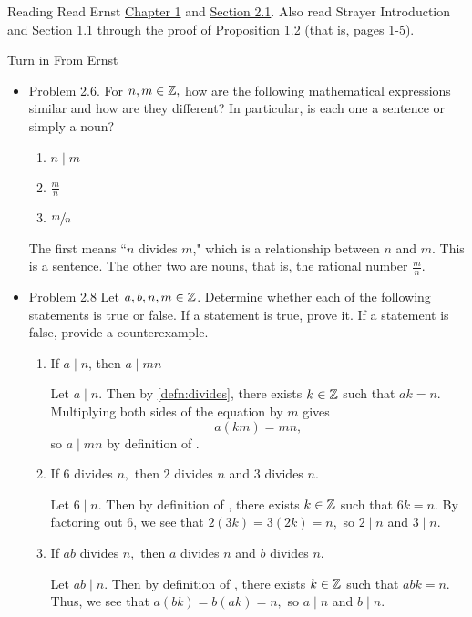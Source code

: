 \documentclass{ximera}
\begin{document}
  
\begin{pre}
\item[Reading]  Read Ernst  \href{https://danaernst.com/IBL-IntroToProof/pretext/chap_intro.html}{Chapter 1} and \href{https://danaernst.com/IBL-IntroToProof/pretext/sec_baby_number_theory.html}{Section 2.1}. Also read Strayer Introduction and Section 1.1 through the proof of Proposition 1.2 (that is, pages 1-5).

\item[Turn in] From Ernst
\begin{itemize}
 \item Problem 2.6. For $n,m\in\mathbb Z,$ how are the following mathematical expressions similar and how are they different? In particular, is each one a sentence or simply a noun?
 
\begin{enumerate}%
\item  $n\mid m$
\item $\frac{m}{n}$ 
\item $\sfrac{m}{n}$ 
\end{enumerate}

\begin{solution}
 The first means ``$n$ divides $m$," which is a relationship between $n$ and $m$. This is a sentence. The other two are nouns, that is, the rational number $\frac{m}{n}$.
\end{solution}

\item Problem 2.8 Let $a,b,n,m\in\mathbb Z$.
 Determine whether each of the following statements is true or false. If a statement is true, prove it. If a statement is false, provide a counterexample.
 \begin{enumerate}%
\item  If $a\mid n$, then $a\mid mn$
\begin{solution}
 Let $a\mid n$. Then by \autoref{defn:divides}, there exists $k\in\mathbb Z$ such that $ak=n$. Multiplying both sides of the equation by $m$ gives \[a(km)=mn,\] so $a\mid mn$ by definition of .
\end{solution}
\item If $6$ divides $n,$ then $2$ divides $n$ and $3$ divides $n$.
\begin{solution}
  Let $6\mid n$. Then by definition of , there exists $k\in\mathbb Z$ such that $6k=n$. By factoring out $6$, we see that $2(3k)=3(2k)=n,$ so $2\mid n$ and $3\mid n$. 
  \end{solution}
\item If $ab$ divides $n,$ then $a$ divides $n$ and $b$ divides $n$.
\begin{solution}
  Let $ab\mid n$. Then by definition of , there exists $k\in\mathbb Z$ such that $abk=n$. Thus, we see that $a(bk)=b(ak)=n,$ so $a\mid n$ and $b\mid n$. 
  \end{solution}
\end{enumerate}


\end{itemize}
\end{pre}
\end{document}
